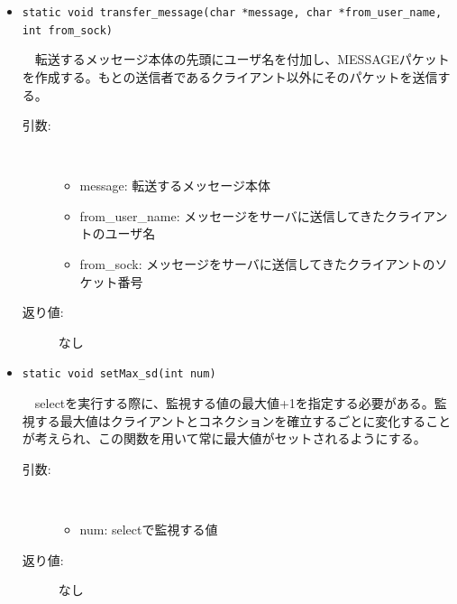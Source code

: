 \documentclass[uplatex,dvipdfmx,11pt,a4paper]{jsarticle} %
\begin{document}
\begin{itemize}

    \item {\tt static void transfer\_message(char *message, char *from\_user\_name, int from\_sock)}

        　転送するメッセージ本体の先頭にユーザ名を付加し、MESSAGEパケットを作成する。もとの送信者であるクライアント以外にそのパケットを送信する。
        \begin{description}
            \item[引数:] \ 

                \begin{itemize}
                        \item message: 転送するメッセージ本体
                        \item from\_user\_name: メッセージをサーバに送信してきたクライアントのユーザ名
                        \item from\_sock: メッセージをサーバに送信してきたクライアントのソケット番号
                \end{itemize}
            \item[返り値:] なし
            \newline
        \end{description}

    \item {\tt static void setMax\_sd(int num)}

        　selectを実行する際に、監視する値の最大値+1を指定する必要がある。監視する最大値はクライアントとコネクションを確立するごとに変化することが考えられ、この関数を用いて常に最大値がセットされるようにする。
        \begin{description}
            \item[引数:] \ 

                \begin{itemize}
                    \item num: selectで監視する値
                \end{itemize}
            \item[返り値:] なし
        \end{description}
    
\end{itemize}
\end{document}
